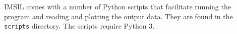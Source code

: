 IMSIL comes with a number of Python scripts that facilitate running the program
and reading and plotting the output data. They are found in the \texttt{scripts}
directory. The scripts require Python 3.
